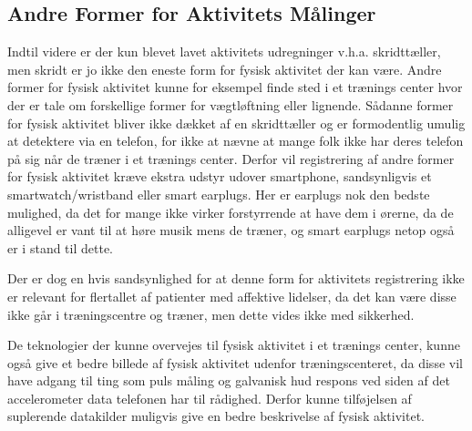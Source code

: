\subsection{Andre Former for Aktivitets Målinger}
Indtil videre er der kun blevet lavet aktivitets udregninger v.h.a. skridttæller, men skridt er jo ikke den eneste form for fysisk aktivitet der kan være.
Andre former for fysisk aktivitet kunne for eksempel finde sted i et trænings center hvor der er tale om forskellige former for vægtløftning eller lignende.
Sådanne former for fysisk aktivitet bliver ikke dækket af en skridttæller og er formodentlig umulig at detektere via en telefon, for ikke at nævne at mange folk ikke har deres telefon på sig når de træner i et trænings center.
Derfor vil registrering af andre former for fysisk aktivitet kræve ekstra udstyr udover smartphone, sandsynligvis et smartwatch/wristband eller smart earplugs.
Her er earplugs nok den bedste mulighed, da det for mange ikke virker forstyrrende at have dem i ørerne, da de alligevel er vant til at høre musik mens de træner, og smart earplugs netop også er i stand til dette.

Der er dog en hvis sandsynlighed for at denne form for aktivitets registrering ikke er relevant for flertallet af patienter med affektive lidelser, da det kan være disse ikke går i træningscentre og træner, men dette vides ikke med sikkerhed.

De teknologier der kunne overvejes til fysisk aktivitet i et trænings center, kunne også give et bedre billede af fysisk aktivitet udenfor træningscenteret, da disse vil have adgang til ting som puls måling og galvanisk hud respons ved siden af det accelerometer data telefonen har til rådighed.
Derfor kunne tilføjelsen af suplerende datakilder muligvis give en bedre beskrivelse af fysisk aktivitet.